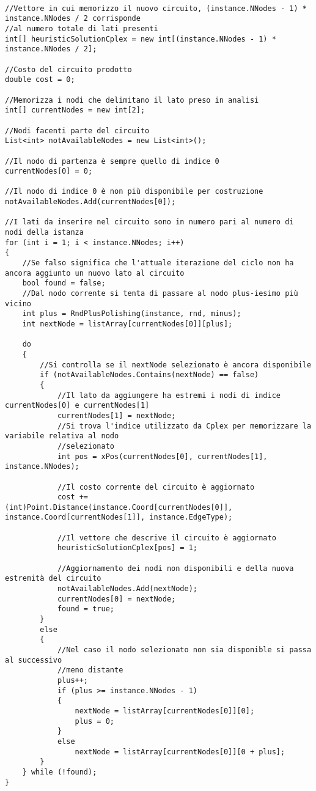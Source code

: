 \documentclass[11pt]{article}
\begin{document}
\begin{lstlisting}

//Vettore in cui memorizzo il nuovo circuito, (instance.NNodes - 1) * instance.NNodes / 2 corrisponde
//al numero totale di lati presenti
int[] heuristicSolutionCplex = new int[(instance.NNodes - 1) * instance.NNodes / 2];

//Costo del circuito prodotto
double cost = 0;

//Memorizza i nodi che delimitano il lato preso in analisi 
int[] currentNodes = new int[2];

//Nodi facenti parte del circuito
List<int> notAvailableNodes = new List<int>();

//Il nodo di partenza è sempre quello di indice 0
currentNodes[0] = 0;

//Il nodo di indice 0 è non più disponibile per costruzione
notAvailableNodes.Add(currentNodes[0]);

//I lati da inserire nel circuito sono in numero pari al numero di nodi della istanza
for (int i = 1; i < instance.NNodes; i++)
{
    //Se falso significa che l'attuale iterazione del ciclo non ha ancora aggiunto un nuovo lato al circuito
    bool found = false;
    //Dal nodo corrente si tenta di passare al nodo plus-iesimo più vicino
    int plus = RndPlusPolishing(instance, rnd, minus);
    int nextNode = listArray[currentNodes[0]][plus];

    do
    {
        //Si controlla se il nextNode selezionato è ancora disponibile
        if (notAvailableNodes.Contains(nextNode) == false)
        {
            //Il lato da aggiungere ha estremi i nodi di indice currentNodes[0] e currentNodes[1]
            currentNodes[1] = nextNode;
            //Si trova l'indice utilizzato da Cplex per memorizzare la variabile relativa al nodo
            //selezionato
            int pos = xPos(currentNodes[0], currentNodes[1], instance.NNodes);

            //Il costo corrente del circuito è aggiornato
            cost += (int)Point.Distance(instance.Coord[currentNodes[0]], instance.Coord[currentNodes[1]], instance.EdgeType);

            //Il vettore che descrive il circuito è aggiornato
            heuristicSolutionCplex[pos] = 1;

            //Aggiornamento dei nodi non disponibili e della nuova estremità del circuito
            notAvailableNodes.Add(nextNode);
            currentNodes[0] = nextNode;
            found = true;
        }
        else
        {
            //Nel caso il nodo selezionato non sia disponible si passa al successivo
            //meno distante
            plus++;
            if (plus >= instance.NNodes - 1)
            {
                nextNode = listArray[currentNodes[0]][0];
                plus = 0;
            }
            else
                nextNode = listArray[currentNodes[0]][0 + plus];
        }
    } while (!found);
}


\end{lstlisting}
\end{document}
